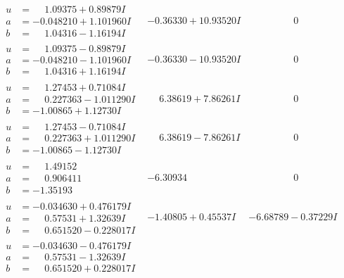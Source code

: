 \documentclass[1p]{elsarticle_modified}
\theoremstyle{definition}
\begin{document}
$$\begin{array}{c|c|c}
\begin{aligned}
u &= \phantom{-}1.09375 + 0.89879 I \\
a &= -0.048210 + 1.101960 I \\
b &= \phantom{-}1.04316 - 1.16194 I\end{aligned}
 & -0.36330 + 10.93520 I & \phantom{-0.000000 } 0 \\ \hline\begin{aligned}
u &= \phantom{-}1.09375 - 0.89879 I \\
a &= -0.048210 - 1.101960 I \\
b &= \phantom{-}1.04316 + 1.16194 I\end{aligned}
 & -0.36330 - 10.93520 I & \phantom{-0.000000 } 0 \\ \hline\begin{aligned}
u &= \phantom{-}1.27453 + 0.71084 I \\
a &= \phantom{-}0.227363 - 1.011290 I \\
b &= -1.00865 + 1.12730 I\end{aligned}
 & \phantom{-}6.38619 + 7.86261 I & \phantom{-0.000000 } 0 \\ \hline\begin{aligned}
u &= \phantom{-}1.27453 - 0.71084 I \\
a &= \phantom{-}0.227363 + 1.011290 I \\
b &= -1.00865 - 1.12730 I\end{aligned}
 & \phantom{-}6.38619 - 7.86261 I & \phantom{-0.000000 } 0 \\ \hline\begin{aligned}
u &= \phantom{-}1.49152\phantom{ +0.000000I} \\
a &= \phantom{-}0.906411\phantom{ +0.000000I} \\
b &= -1.35193\phantom{ +0.000000I}\end{aligned}
 & -6.30934\phantom{ +0.000000I} & \phantom{-0.000000 } 0 \\ \hline\begin{aligned}
u &= -0.034630 + 0.476179 I \\
a &= \phantom{-}0.57531 + 1.32639 I \\
b &= \phantom{-}0.651520 - 0.228017 I\end{aligned}
 & -1.40805 + 0.45537 I & -6.68789 - 0.37229 I \\ \hline\begin{aligned}
u &= -0.034630 - 0.476179 I \\
a &= \phantom{-}0.57531 - 1.32639 I \\
b &= \phantom{-}0.651520 + 0.228017 I\end{aligned}

\end{array}$$
\end{document}
